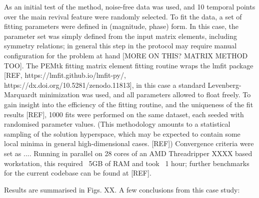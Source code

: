 As an initial test of the method, noise-free data was used, and 10 temporal points over the main revival feature were randomly selected. To fit the data, a set of fitting parameters were defined in (magnitude, phase) form. In this case, the parameter set was simply defined from the input matrix elements, including symmetry relations; in general this step in the protocol may require manual configuration for the problem at hand [MORE ON THIS? MATRIX METHOD TOO]. The PEMtk fitting matrix element fitting routine wraps the lmfit package [REF, https://lmfit.github.io/lmfit-py/, https://dx.doi.org/10.5281/zenodo.11813], in this case a standard Levenberg-Marquardt minimization was used, and all parameters allowed to float freely. To gain insight into the efficiency of the fitting routine, and the uniqueness of the fit results [REF], 1000 fits were performed on the same dataset, each seeded with randomised parameter values. (This methodology amounts to a statistical sampling of the solution hyperspace, which may be expected to contain some local minima in general high-dimensional cases. [REF]) Convergence criteria were set as .... Running in parallel on 28 cores of an AMD Threadripper XXXX based workstation, this required ~5GB of RAM and took ~1 hour; further benchmarks for the current codebase can be found at [REF].

Results are summarised in Figs. XX. A few conclusions from this case study:

